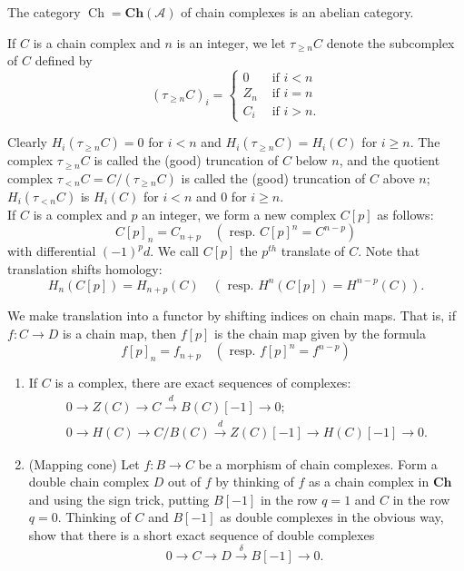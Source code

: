 \begin{example}
\begin{theo}
The category $\operatorname{Ch}=\boldsymbol{C h}(\mathcal{A})$ of chain complexes is an abelian category.   
\end{theo}

If $C$ is a chain complex and $n$ is an integer, we let $\tau_{\geq n} C$ denote the subcomplex of $C$ defined by
$$
\left(\tau_{\geq n} C\right)_i= \begin{cases}0 & \text { if } i<n \\ Z_n & \text { if } i=n \\ C_i & \text { if } i>n .\end{cases}
$$

Clearly $H_i\left(\tau_{\geq n} C\right)=0$ for $i<n$ and $H_i\left(\tau_{\geq n} C\right)=H_i(C)$ for $i \geq n$. The complex $\tau_{\geq n} C$ is called the (good) truncation of $C$ below $n$, and the quotient complex $\tau_{<n} C=C /\left(\tau_{\geq n} C\right)$ is called the (good) truncation of $C$ above $n$; $H_i\left(\tau_{<n} C\right)$ is $H_i(C)$ for $i<n$ and 0 for $i \geq n$.\\

If $C$ is a complex and $p$ an integer, we form a new complex $C[p]$ as follows:
$$
C[p]_n=C_{n+p} \quad\left(\text { resp. } C[p]^n=C^{n-p}\right)
$$
with differential $(-1)^p d$. We call $C[p]$ the $p^{t h}$ translate of $C$. Note that translation shifts homology:
$$
H_n(C[p])=H_{n+p}(C) \quad\left(\text { resp. } H^n(C[p])=H^{n-p}(C)\right) .
$$

We make translation into a functor by shifting indices on chain maps. That is, if $f: C \rightarrow D$ is a chain map, then $f[p]$ is the chain map given by the formula
$$
f[p]_n=f_{n+p} \quad\left(\text { resp. } f[p]^n=f^{n-p}\right)
$$ 

\begin{prop}
    \begin{enumerate}
        \item If $C$ is a complex, there are exact sequences of complexes:
        $$
        \begin{gathered}
        0 \longrightarrow Z(C) \longrightarrow C \xrightarrow{d} B(C)[-1] \longrightarrow 0 ; \\
        0 \longrightarrow H(C) \longrightarrow C / B(C) \xrightarrow{d} Z(C)[-1] \longrightarrow H(C)[-1] \longrightarrow 0 .
        \end{gathered}
        $$
        
        \item (Mapping cone) Let $f: B \rightarrow C$ be a morphism of chain complexes. Form a double chain complex $D$ out of $f$ by thinking of $f$ as a chain complex in $\mathbf{C h}$ and using the sign trick, putting $B[-1]$ in the row $q=1$ and $C$ in the row $q=0$. Thinking of $C$ and $B[-1]$ as double complexes in the obvious way, show that there is a short exact sequence of double complexes
        $$
        0 \longrightarrow C \longrightarrow D \xrightarrow{\delta} B[-1] \longrightarrow 0 \text {. }
        $$
        

\end{enumerate}
\end{prop}
\end{example}
